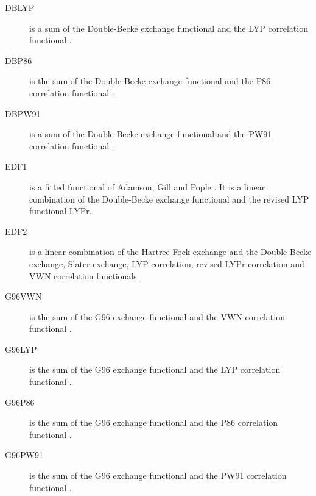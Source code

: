 \begin{description}
\item[DBLYP] is a sum of the Double-Becke exchange functional and
  the LYP correlation functional 
  \cite{dft:becke88,dft:edf1,dft:lyp1,dft:lyp2}.

\item[DBP86] is the sum of the Double-Becke exchange functional and
  the P86 correlation functional \cite{dft:becke88,dft:edf1,dft:p86}.

\item[DBPW91] is a sum of the Double-Becke exchange functional and
  the PW91 correlation functional \cite{dft:becke88,dft:edf1,dft:pw91}.

\item[EDF1] is a fitted functional of Adamson, Gill and Pople \cite{dft:edf1}.
  It is a linear combination of the Double-Becke exchange functional and the revised LYP
  functional LYPr.

\item[EDF2] is a linear combination of the Hartree-Fock exchange and the Double-Becke 
  exchange, Slater exchange, LYP correlation, revised LYPr correlation and VWN 
  correlation functionals \cite{dft:edf2}.

\item[G96VWN] is the sum of the G96 exchange functional and the VWN 
  correlation functional \cite{dft:g96}.

\item[G96LYP] is the sum of the G96 exchange functional and the LYP
  correlation functional \cite{dft:g96}.

\item[G96P86] is the sum of the G96 exchange functional and the P86
  correlation functional \cite{dft:g96}.

\item[G96PW91] is the sum of the G96 exchange functional and the PW91
  correlation functional \cite{dft:g96}.


\end{description}
